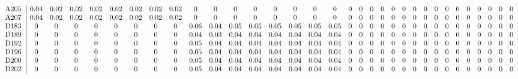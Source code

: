 \begin{table}[H]
\begin{center}
\begin{math}
\begin{array}{c|cccccccccccccccccccccccccccccccc}
\mathrm{A205} \hspace*{2pt} &       0.04 &       0.02 &       0.02 &       0.02 &       0.02 &       0.02 &       0.02 &       0.02 &  0 &  0 &  0 &  0 &  0 &  0 &  0 &  0 &  0 &  0 &  0 &  0 &  0 &  0 &  0 &  0 &  0 &  0 &  0 &  0 &  0 &  0 &  0 &  0 \\
\mathrm{A207} \hspace*{2pt} &       0.04 &       0.02 &       0.02 &       0.02 &       0.02 &       0.02 &       0.02 &       0.02 &  0 &  0 &  0 &  0 &  0 &  0 &  0 &  0 &  0 &  0 &  0 &  0 &  0 &  0 &  0 &  0 &  0 &  0 &  0 &  0 &  0 &  0 &  0 &  0 \\
\mathrm{D183} \hspace*{2pt} &  0 &  0 &  0 &  0 &  0 &  0 &  0 &  0 &       0.06 &       0.04 &       0.05 &       0.05 &       0.05 &       0.05 &       0.05 &       0.05 &  0 &  0 &  0 &  0 &  0 &  0 &  0 &  0 &  0 &  0 &  0 &  0 &  0 &  0 &  0 &  0 \\
\mathrm{D189} \hspace*{2pt} &  0 &  0 &  0 &  0 &  0 &  0 &  0 &  0 &       0.04 &       0.03 &       0.04 &       0.04 &       0.04 &       0.04 &       0.04 &       0.04 &  0 &  0 &  0 &  0 &  0 &  0 &  0 &  0 &  0 &  0 &  0 &  0 &  0 &  0 &  0 &  0 \\
\mathrm{D192} \hspace*{2pt} &  0 &  0 &  0 &  0 &  0 &  0 &  0 &  0 &       0.05 &       0.04 &       0.04 &       0.04 &       0.04 &       0.04 &       0.04 &       0.04 &  0 &  0 &  0 &  0 &  0 &  0 &  0 &  0 &  0 &  0 &  0 &  0 &  0 &  0 &  0 &  0 \\
\mathrm{D196} \hspace*{2pt} &  0 &  0 &  0 &  0 &  0 &  0 &  0 &  0 &       0.05 &       0.04 &       0.04 &       0.04 &       0.04 &       0.04 &       0.04 &       0.04 &  0 &  0 &  0 &  0 &  0 &  0 &  0 &  0 &  0 &  0 &  0 &  0 &  0 &  0 &  0 &  0 \\
\mathrm{D200} \hspace*{2pt} &  0 &  0 &  0 &  0 &  0 &  0 &  0 &  0 &       0.05 &       0.04 &       0.04 &       0.04 &       0.04 &       0.04 &       0.04 &       0.04 &  0 &  0 &  0 &  0 &  0 &  0 &  0 &  0 &  0 &  0 &  0 &  0 &  0 &  0 &  0 &  0 \\
\mathrm{D202} \hspace*{2pt} &  0 &  0 &  0 &  0 &  0 &  0 &  0 &  0 &       0.05 &       0.04 &       0.04 &       0.04 &       0.04 &       0.04 &       0.04 &       0.04 &  0 &  0 &  0 &  0 &  0 &  0 &  0 &  0 &  0 &  0 &  0 &  0 &  0 &  0 &  0 &  0 \\

\end{array}
\end{math}
\end{center}
\end{table}
